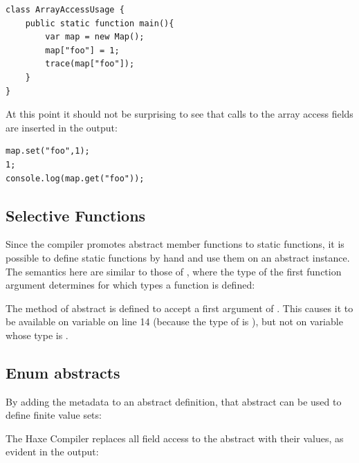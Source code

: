 \documentclass{haxe}
\begin{document}
\begin{lstlisting}
class ArrayAccessUsage {
	public static function main(){
		var map = new Map();
		map["foo"] = 1;
		trace(map["foo"]);
	}
}
\end{lstlisting}
At this point it should not be surprising to see that calls to the array access fields are inserted in the output:

\begin{lstlisting}
map.set("foo",1);
1;
console.log(map.get("foo"));
\end{lstlisting}


\subsection{Selective Functions}
\label{types-abstract-selective-functions}

Since the compiler promotes abstract member functions to static functions, it is possible to define static functions by hand and use them on an abstract instance. The semantics here are similar to those of , where the type of the first function argument determines for which types a function is defined:

The method  of abstract  is defined to accept a first argument of . This causes it to be available on variable  on line 14 (because the type of  is ), but not on variable  whose type is .



\subsection{Enum abstracts}
\label{types-abstract-enum}

By adding the  metadata to an abstract definition, that abstract can be used to define finite value sets:


The Haxe Compiler replaces all field access to the  abstract with their values, as evident in the  output:
\end{document}
